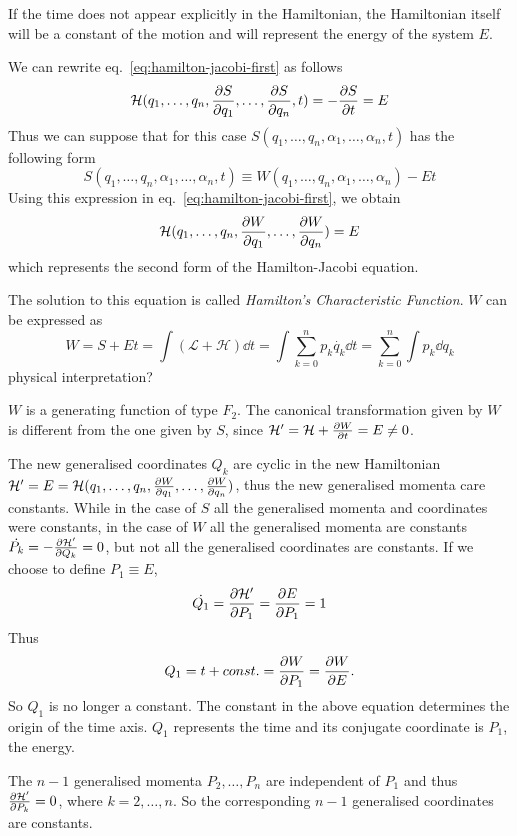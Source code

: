 \documentclass[../thesis.tex]{subfiles}
\begin{document}
If the time does not appear explicitly in the Hamiltonian, the Hamiltonian itself
will be a constant of the motion and will represent the energy of the system \(E\).

We can rewrite eq.~\eqref{eq:hamilton-jacobi-first} as follows
\[
  \mathcal{H}(q_1,\dotsc,q_n,\pdv{S}{q_1},\dotsc,\pdv{S}{q_n},t) = - \pdv{S}{t} = E
\]
Thus we can suppose that for this case \(S(q_1,\dotsc,q_n,\alpha_1,\dotsc,\alpha_n,t)\)
has the following form
\[
  S(q_1,\dotsc,q_n,\alpha_1,\dotsc,\alpha_n,t) \equiv W(q_1,\dotsc,q_n,\alpha_1,\dotsc,\alpha_n) - Et
\]
Using this expression in eq.~\eqref{eq:hamilton-jacobi-first}, we obtain
\begin{equation}
  \label{eq:hamilton-jacobi-second}
  \mathcal{H}(q_1,\dotsc,q_n,\pdv{W}{q_1},\dotsc,\pdv{W}{q_n}) = E
\end{equation}
which represents the second form of the Hamilton-Jacobi equation.

The solution to this equation is called \emph{Hamilton's Characteristic Function}.
\(W\) can be expressed as
\[
  W = S + Et = \int \left(\mathcal{L} + \mathcal{H} \right) \dd{t}
    = \int \sum_{k=0}^n p_k \dot{q_k} \dd{t}
    = \sum_{k=0}^n \int p_k \dd{q_k}
\]
{\color{red}physical interpretation?}

\(W\) is a generating function of type \(F_2\). The canonical transformation given by \(W\)
is different from the one given by \(S\), since
\(\mathcal{H'} = \mathcal{H} + \pdv{W}{t} = E \neq 0\).

The new generalised coordinates \(Q_k\) are cyclic in the new Hamiltonian
\(\mathcal{H'} = E = \mathcal{H}(q_1,\dotsc,q_n,\pdv{W}{q_1},\dotsc,\pdv{W}{q_n})\),
thus the new generalised momenta care constants. While in the case of \(S\)
all the generalised momenta and coordinates were constants, in the case of \(W\)
all the generalised momenta are constants \(\dot{P_k}=-\pdv{\mathcal{H'}}{Q_k}=0\),
but not all the generalised coordinates are constants.
If we choose to define \(P_1 \equiv E\),
\[
  \dot{Q_1} = \pdv{\mathcal{H'}}{P_1} = \pdv{E}{P_1} = 1
\]
Thus
\[
  Q_1 = t + const. = \pdv{W}{P_1} = \pdv{W}{E}.
\]
So \(Q_1\) is no longer a constant. The constant in the above equation determines the
origin of the time axis. \(Q_1\) represents the time and its conjugate coordinate is
\(P_1\), the energy.

The \(n-1\) generalised momenta \(P_2,\dotsc,P_n\) are independent of \(P_1\)
and thus \(\pdv{\mathcal{H'}}{P_k} = 0\), where \(k=2,\dotsc,n\). So the corresponding
\(n-1\) generalised coordinates are constants.
\end{document}
